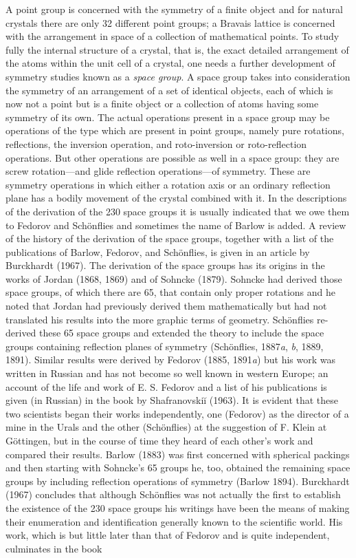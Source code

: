 \documentclass[11pt,a4paper,twoside,openright]{book}
\begin{document}
A point group is concerned with the symmetry of a finite object and for natural crystals there are only 32 different point groups; a Bravais lattice is concerned with the arrangement in space of a collection of mathematical points. To study fully the internal structure of a crystal, that is, the exact detailed arrangement of the atoms within the unit cell of a crystal, one needs a further development of symmetry studies known as a \textit{space group}. A space group takes into consideration the symmetry of an arrangement of a set of identical objects, each of which is now not a point but is a finite object or a collection of atoms having some symmetry of its own. The actual operations present in a space group may be operations of the type which are present in point groups, namely pure rotations, reflections, the inversion operation, and roto-inversion or roto-reflection operations. But other operations are possible as well in a space group: they are screw rotation—and glide reflection operations—of symmetry. These are symmetry operations in which either a rotation axis or an ordinary reflection plane has a bodily movement of the crystal combined with it. In the descriptions of the derivation of the 230 space groups it is usually indicated that we owe them to Fedorov and Schönflies and sometimes the name of Barlow is added. A review of the history of the derivation of the space groups, together with a list of the publications of Barlow, Fedorov, and Schönflies, is given in an article by Burckhardt (1967). The derivation of the space groups has its origins in the works of Jordan (1868, 1869) and of Sohncke (1879). Sohncke had derived those space groups, of which there are 65, that contain only proper rotations and he noted that Jordan had previously derived them mathematically but had not translated his results into the more graphic terms of geometry. Schönflies re-derived these 65 space groups and extended the theory to include the space groups containing reflection planes of symmetry (Schönflies, 1887\textit{a}, \textit{b}, 1889, 1891). Similar results were derived by Fedorov (1885, 1891\textit{a}) but his work was written in Russian and has not become so well known in western Europe; an account of the life and work of E. S. Fedorov and a list of his publications is given (in Russian) in the book by Shafranovskiĭ (1963). It is evident that these two scientists began their works independently, one (Fedorov) as the director of a mine in the Urals and the other (Schönflies) at the suggestion of F. Klein at Göttingen, but in the course of time they heard of each other's work and compared their results. Barlow (1883) was first concerned with spherical packings and then starting with Sohncke's 65 groups he, too, obtained the remaining space groups by including reflection operations of symmetry (Barlow 1894). Burckhardt (1967) concludes that although Schönflies was not actually the first to establish the existence of the 230 space groups his writings have been the means of making their enumeration and identification generally known to the scientific world. His work, which is but little later than that of Fedorov and is quite independent, culminates in the book
\end{document}
